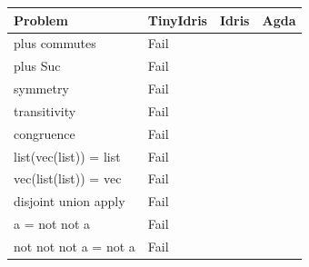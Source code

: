 \documentclass[a4paper]{article}
\begin{document}
\begin{center}
\begin{tabular}{llll}
Problem & TinyIdris & Idris & Agda\\
\hline
plus commutes & Fail &  & \\
plus Suc & Fail &  & \\
symmetry & Fail &  & \\
transitivity & Fail &  & \\
congruence & Fail &  & \\
list(vec(list)) = list & Fail &  & \\
vec(list(list)) = vec & Fail &  & \\
disjoint union apply & Fail &  & \\
a = not not a & Fail &  & \\
not not not a = not a & Fail &  & \\
\end{tabular}
\end{center}


\clearpage
\end{document}
